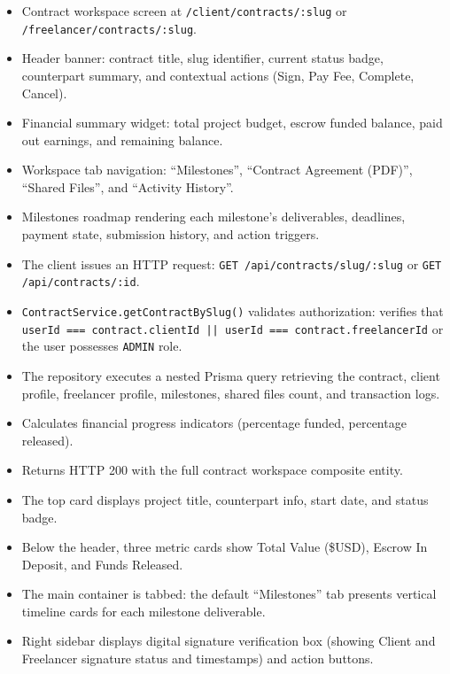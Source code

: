 \begin{itemize}[leftmargin=1.6em,topsep=3pt,itemsep=2pt,parsep=0pt,label=$\bullet$]
      \item Contract workspace screen at \texttt{/\allowbreak{}client/\allowbreak{}contracts/\allowbreak{}:\allowbreak{}slug} or \texttt{/\allowbreak{}freelancer/\allowbreak{}contracts/\allowbreak{}:\allowbreak{}slug}.
      \item Header banner: contract title, slug identifier, current status badge, counterpart summary, and contextual actions (Sign, Pay Fee, Complete, Cancel).
      \item Financial summary widget: total project budget, escrow funded balance, paid out earnings, and remaining balance.
      \item Workspace tab navigation: ``Milestones'', ``Contract Agreement (PDF)'', ``Shared Files'', and ``Activity History''.
      \item Milestones roadmap rendering each milestone's deliverables, deadlines, payment state, submission history, and action triggers.
\end{itemize}

\begin{itemize}[leftmargin=1.6em,topsep=3pt,itemsep=2pt,parsep=0pt,label=$\bullet$]
      \item The client issues an HTTP request: \texttt{GET /api/contracts/slug/:slug} or \texttt{GET /api/contracts/:id}.
      \item \texttt{ContractService.getContractBySlug()} validates authorization: verifies that \texttt{userId === contract.clientId || userId === contract.freelancerId} or the user possesses \texttt{ADMIN} role.
      \item The repository executes a nested Prisma query retrieving the contract, client profile, freelancer profile, milestones, shared files count, and transaction logs.
      \item Calculates financial progress indicators (percentage funded, percentage released).
      \item Returns HTTP 200 with the full contract workspace composite entity.
\end{itemize}

\begin{itemize}[leftmargin=1.6em,topsep=3pt,itemsep=2pt,parsep=0pt,label=$\bullet$]
      \item The top card displays project title, counterpart info, start date, and status badge.
      \item Below the header, three metric cards show Total Value (\$USD), Escrow In Deposit, and Funds Released.
      \item The main container is tabbed: the default ``Milestones'' tab presents vertical timeline cards for each milestone deliverable.
      \item Right sidebar displays digital signature verification box (showing Client and Freelancer signature status and timestamps) and action buttons.
\end{itemize}

